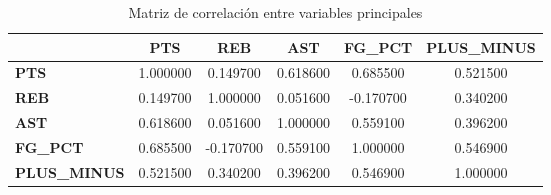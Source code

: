 \begin{table}
\caption{Matriz de correlación entre variables principales}
\label{tab:correlacion}
\begin{tabular}{lccccc}
\toprule
 & PTS & REB & AST & FG_PCT & PLUS_MINUS \\
\midrule
\textbf{PTS} & 1.000000 & 0.149700 & 0.618600 & 0.685500 & 0.521500 \\
\textbf{REB} & 0.149700 & 1.000000 & 0.051600 & -0.170700 & 0.340200 \\
\textbf{AST} & 0.618600 & 0.051600 & 1.000000 & 0.559100 & 0.396200 \\
\textbf{FG_PCT} & 0.685500 & -0.170700 & 0.559100 & 1.000000 & 0.546900 \\
\textbf{PLUS_MINUS} & 0.521500 & 0.340200 & 0.396200 & 0.546900 & 1.000000 \\
\bottomrule
\end{tabular}
\end{table}
